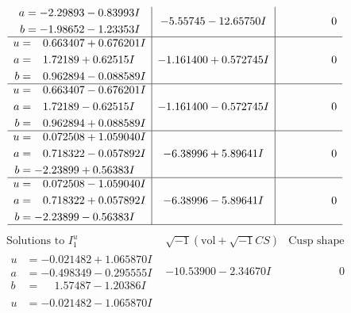 \documentclass[1p]{elsarticle_modified}
\theoremstyle{definition}
\newcommand{\I}{\sqrt{-1}}
\begin{document}
$$\begin{array}{c|c|c}
\begin{aligned}
a &= -2.29893 - 0.83993 I \\
b &= -1.98652 - 1.23353 I\end{aligned}
 & -5.55745 - 12.65750 I & \phantom{-0.000000 } 0 \\ \hline\begin{aligned}
u &= \phantom{-}0.663407 + 0.676201 I \\
a &= \phantom{-}1.72189 + 0.62515 I \\
b &= \phantom{-}0.962894 - 0.088589 I\end{aligned}
 & -1.161400 + 0.572745 I & \phantom{-0.000000 } 0 \\ \hline\begin{aligned}
u &= \phantom{-}0.663407 - 0.676201 I \\
a &= \phantom{-}1.72189 - 0.62515 I \\
b &= \phantom{-}0.962894 + 0.088589 I\end{aligned}
 & -1.161400 - 0.572745 I & \phantom{-0.000000 } 0 \\ \hline\begin{aligned}
u &= \phantom{-}0.072508 + 1.059040 I \\
a &= \phantom{-}0.718322 - 0.057892 I \\
b &= -2.23899 + 0.56383 I\end{aligned}
 & -6.38996 + 5.89641 I & \phantom{-0.000000 } 0 \\ \hline\begin{aligned}
u &= \phantom{-}0.072508 - 1.059040 I \\
a &= \phantom{-}0.718322 + 0.057892 I \\
b &= -2.23899 - 0.56383 I\end{aligned}
 & -6.38996 - 5.89641 I & \phantom{-0.000000 } 0\\
 \hline 
 \end{array}$$\newpage$$\begin{array}{c|c|c}  
\text{Solutions to }I^u_{1}& \I (\text{vol} + \sqrt{-1}CS) & \text{Cusp shape}\\
 \hline 
\begin{aligned}
u &= -0.021482 + 1.065870 I \\
a &= -0.498349 - 0.295555 I \\
b &= \phantom{-}1.57487 - 1.20386 I\end{aligned}
 & -10.53900 - 2.34670 I & \phantom{-0.000000 } 0 \\ \hline\begin{aligned}
u &= -0.021482 - 1.065870 I \\

\end{aligned}
\end{array}$$
\end{document}
